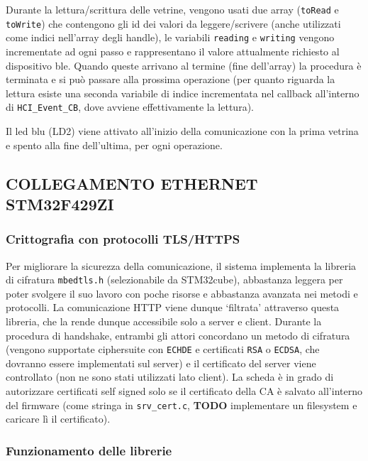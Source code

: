 Durante la lettura/scrittura delle vetrine, vengono usati due array (\texttt{toRead} e \texttt{toWrite}) che contengono gli id dei valori da leggere/scrivere (anche utilizzati come indici nell'array degli handle), le variabili \texttt{reading} e \texttt{writing} vengono incrementate ad ogni passo e rappresentano il valore attualmente richiesto al dispositivo ble. Quando queste arrivano al termine (fine dell'array) la procedura \`e terminata e si pu\`o passare alla prossima operazione (per quanto riguarda la lettura esiste una seconda variabile di indice incrementata nel callback all'interno di \texttt{HCI\_Event\_CB}, dove avviene effettivamente la lettura).

Il led blu (LD2) viene attivato all'inizio della comunicazione con la prima vetrina e spento alla fine dell'ultima, per ogni operazione.

\subsection{COLLEGAMENTO ETHERNET STM32F429ZI}

\subsubsection{Crittografia con protocolli TLS/HTTPS}

Per migliorare la sicurezza della comunicazione, il sistema implementa la libreria di cifratura \texttt{mbedtls.h} (selezionabile da STM32cube), abbastanza leggera per poter svolgere il suo lavoro con poche risorse e abbastanza avanzata nei metodi e protocolli. La comunicazione HTTP viene dunque `filtrata' attraverso questa libreria, che la rende dunque accessibile solo a server e client. Durante la procedura di handshake, entrambi gli attori concordano un metodo di cifratura (vengono supportate ciphersuite con \texttt{ECHDE} e certificati \texttt{RSA} o \texttt{ECDSA}, che dovranno essere implementati sul server) e il certificato del server viene controllato (non ne sono stati utilizzati lato client). La scheda \`e in grado di autorizzare certificati self signed solo se il certificato della CA \`e salvato all'interno del firmware (come stringa in \texttt{srv\_cert.c}, \textbf{TODO} implementare un filesystem e caricare l\`i il certificato).

\subsubsection{Funzionamento delle librerie}

